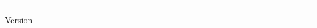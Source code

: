 {\begin{titlepage}
        \vfill

        {\color{UofSCGarnet}\rule{\textwidth}{3pt}}
        \vspace{0.3cm}
        {\large Version \textbookversion{} \hfill \textbookyear \par}
    \end{titlepage}
}
